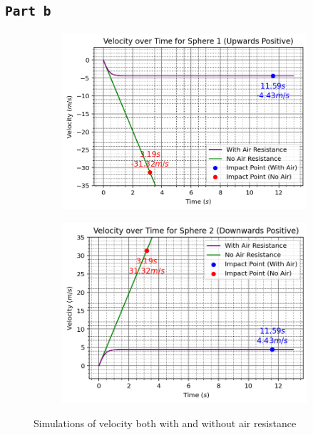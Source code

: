 \documentclass{article}
\let\oldsubsection\subsection
\renewcommand{\subsection}[1]{%
  \oldsubsection{\texttt{#1}}%
  \setcounter{subsubsection}{-1}%
}
\begin{document}
\subsection{Part b}
\begin{figure}[h]
    \centering
    \begin{subfigure}{0.8\textwidth}
        \centering
        \includegraphics[width=1\textwidth]{Figures/vt1.png}
    \end{subfigure}
    \begin{subfigure}{0.8\textwidth}
        \centering
        \includegraphics[width=1\textwidth]{Figures/vt2.png}
    \end{subfigure}
    \caption{Simulations of velocity both with and without air resistance}
    \label{fig:sim_v}
\end{figure}
\end{document}
